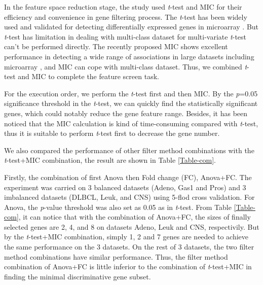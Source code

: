 \documentclass[10pt,journal,compsoc]{IEEEtran}
\begin{document}
	In the feature space reduction stage, the study used \emph{t}-test and MIC for their efficiency and convenience in gene filtering process. The \emph{t}-test has been widely used and validated for detecting differentially expressed genes in microarray \cite{RN413, RN414, RN421}. But \emph{t}-test has limitation in dealing with multi-class dataset for multi-variate \emph{t}-test can't be performed directly. The recently proposed MIC shows excellent performance in detecting a wide range of associations in large datasets including microarray \cite{W8,W16}, and MIC can cope with multi-class dataset. Thus, we combined \emph{t}-test and MIC to complete the feature screen task.

	For the execution order, we perform the \emph{t}-test first and then MIC. By the \emph{p}=0.05 significance threshold in the \emph{t}-test, we can quickly find the statistically significant genes, which could notably reduce the gene feature range.
	Besides, it has been noticed that the MIC calculation is kind of time-consuming compared with \emph{t}-test, thus it is suitable to perform \emph{t}-test first to decrease the gene number. 


	We also compared the performance of other filter method combinations with the \emph{t}-test+MIC combination, the result are shown in Table \ref{Table-com}.

	Firstly, the combination of first Anova then Fold change (FC), Anova+FC. The experiment was carried on 3 balanced datasets (Adeno, Gas1 and Pros) and 3 imbalanced datasets (DLBCL, Leuk, and CNS) using 5-flod cross validation. For Anova, the \emph{p}-value threshold was also set as 0.05 as in \emph{t}-test. From Table \ref{Table-com}, it can notice that with the combination of Anova+FC, the sizes of finally selected genes are 2, 4, and 8 on datasets Adeno, Leuk and CNS, respectivily. But by the \emph{t}-test+MIC combination, simply 1, 2 and 7 genes are needed to achieve the same performance on the 3 datasets. On the rest of 3 datasets, the two filter method combinations have similar performance. Thus, the filter method combination of Anova+FC is little inferior to the combination of \emph{t}-test+MIC in finding the minimal discriminative gene subset.
\end{document}
